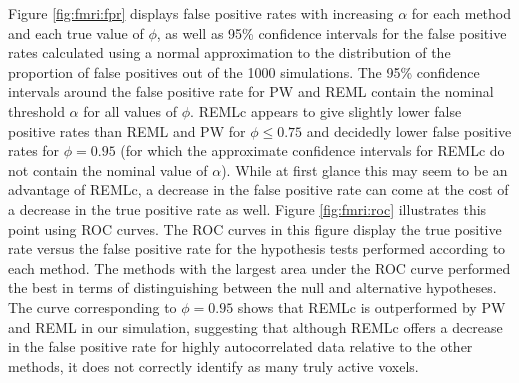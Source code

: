 Figure \ref{fig:fmri:fpr} displays false positive rates with increasing $\alpha$ for each method and each true value of $\phi$, as well as 95\% confidence intervals for the false positive rates calculated using a normal approximation to the distribution of the proportion of false positives out of the 1000 simulations. The 95\% confidence intervals around the false positive rate for PW and REML contain the nominal threshold $\alpha$ for all values of $\phi$. REMLc appears to give slightly lower false positive rates than REML and PW for $\phi \le 0.75$ and decidedly lower false positive rates for $\phi = 0.95$ (for which the approximate confidence intervals for REMLc do not contain the nominal value of $\alpha$). While at first glance this may seem to be an advantage of REMLc, a decrease in the false positive rate can come at the cost of a decrease in the true positive rate as well. Figure \ref{fig:fmri:roc} illustrates this point using ROC curves. The ROC curves in this figure display the true positive rate versus the false positive rate for the hypothesis tests performed according to each method. The methods with the largest area under the ROC curve performed the best in terms of distinguishing between the null and alternative hypotheses. The curve corresponding to $\phi = 0.95$ shows that REMLc is outperformed by PW and REML in our simulation, suggesting that although REMLc offers a decrease in the false positive rate for highly autocorrelated data relative to the other methods, it does not correctly identify as many truly active voxels.

